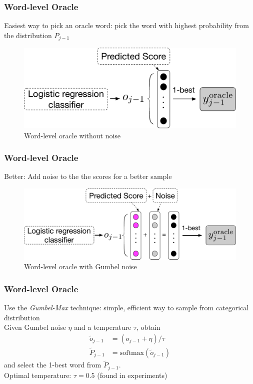 \documentclass{beamer}
\begin{document}
\begin{frame}
    \frametitle{Word-level Oracle}
    Easiest way to pick an oracle word: pick the word with highest probability from the distribution $P_{j-1}$
    \begin{figure}
        \centering
        \includegraphics[width=\textwidth]{fig/wonoise.pdf}
        \caption{Word-level oracle without noise}
    \end{figure}
\end{frame}


\begin{frame}
    \frametitle{Word-level Oracle}
    Better: Add noise to the the scores for a better sample
    \begin{figure}
        \centering
        \includegraphics[width=\textwidth]{fig/oracle_noise.pdf}
        \caption{Word-level oracle with Gumbel noise}
    \end{figure}
\end{frame}


\begin{frame}
    \frametitle{Word-level Oracle}
    Use the \emph{Gumbel-Max} technique: simple, efficient way to sample from categorical distribution\\
    \bigskip
    Given Gumbel noise $\eta$ and a temperature $\tau$, obtain
    \begin{align}
        \tilde{o}_{j-1} &= \left(o_{j-1} + \eta\right)/\tau\\
        \tilde{P}_{j-1} &= \mathrm{softmax}(\tilde{o}_{j-1})
    \end{align}
    and select the 1-best word from $\tilde{P}_{j-1}$.\\
    \bigskip
    Optimal temperature: $\tau = 0.5$ (found in experiments)
\end{frame}
\end{document}
